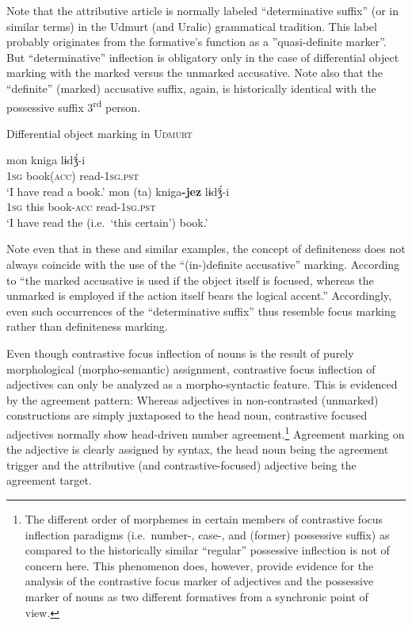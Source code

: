 Note that the attributive article is normally labeled “determinative suffix” (or in similar terms) in the Udmurt (and Uralic) grammatical tradition. This label probably originates from the formative's function as a ”quasi-definite marker”. But “determinative” inflection is obligatory only in the case of differential object marking with the marked versus the unmarked accusative. Note also that the “definite” (marked) accusative suffix, again, is historically identical with the possessive suffix 3\textsuperscript{rd} person.%
\newpage
\begin{exe}
\ex Differential object marking in \textsc{Udmurt} \citep[22]{winkler2001}
\begin{xlist}
\ex
\gll	mon kniga lɨdǯ́-i\\
	\textsc{1sg} book(\textsc{acc}) read-\textsc{1sg.pst}\\
\glt	‘I have read a book.’
\ex	
\gll	mon (ta) kniga\textbf{-jez} lɨdǯ́-i\\
	\textsc{1sg} this book-\textsc{acc} read-\textsc{1sg.pst}\\
\glt	‘I have read the (i.e.~‘this certain’) book.’
\end{xlist}
\end{exe}
Note even that in these and similar examples, the concept of definiteness does not always coincide with the use of the “(in-)definite accusative” marking. According to \citet[21]{winkler2001} “the marked accusative is used if the object itself is focused, whereas the unmarked is employed if the action itself bears the logical accent.” Accordingly, even such occurrences of the “determinative suffix” thus resemble focus marking rather than definiteness marking.

Even though contrastive focus inflection of nouns is the result of purely morphological (morpho-semantic) assignment, contrastive focus inflection of adjectives can only be analyzed as a morpho-syntactic feature. This is evidenced by the agreement pattern: Whereas adjectives in non-contrasted (unmarked) constructions are simply juxtaposed to the head noun, contrastive focused adjectives normally show head-driven number agreement.\footnote{The different order of morphemes in certain members of contrastive focus inflection paradigms (i.e.~number-, case-, and (former) possessive suffix) as compared to the historically similar “regular” possessive inflection \citep[32]{winkler2001} is not of concern here. This phenomenon does, however, provide evidence for the analysis of the contrastive focus marker of adjectives and the possessive marker of nouns as two different formatives from a synchronic point of view.} Agreement marking on the adjective is clearly assigned by syntax, the head noun being the agreement trigger and the attributive (and contrastive-focused) adjective being the agreement target.


